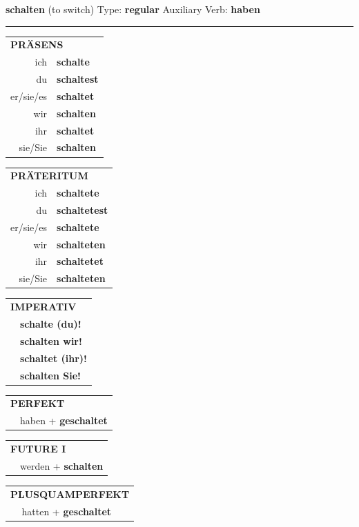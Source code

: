 \documentclass[10pt,a4paper]{revtex4-2}
\begin{document}
\begin{verbbox}
{\Large \bf schalten} (to switch) \hfill Type: \textbf{regular} \hfill Auxiliary Verb: \textbf{haben} 

\vspace{5pt}
\hrule
\vspace{5pt}

\begin{tabular}{rl}
\multicolumn{2}{l}{\textbf{PRÄSENS}}\\
ich & \textbf{schalte}\\
du & \textbf{schaltest}\\
er/sie/es & \textbf{schaltet}\\
wir & \textbf{schalten}\\
ihr & \textbf{schaltet}\\
sie/Sie & \textbf{schalten}\\
\end{tabular}
\hfill
\begin{tabular}{rl}
\multicolumn{2}{l}{\textbf{PRÄTERITUM}}\\
ich & \textbf{schaltete}\\
du & \textbf{schaltetest}\\
er/sie/es & \textbf{schaltete}\\
wir & \textbf{schalteten}\\
ihr & \textbf{schaltetet}\\
sie/Sie & \textbf{schalteten}\\
\end{tabular}
\hfill
\begin{tabular}{rl}
\multicolumn{2}{l}{\textbf{IMPERATIV}}\\
& \textbf{schalte (du)!}\\
& \textbf{schalten wir!}\\
& \textbf{schaltet (ihr)!}\\
& \textbf{schalten Sie!}\\
\end{tabular}

\vspace{10pt}

\begin{tabular}{rl}
\multicolumn{2}{l}{\textbf{PERFEKT}}\\
& haben + \textbf{geschaltet}\\
\end{tabular}
\hfill
\begin{tabular}{rl}
\multicolumn{2}{l}{\textbf{FUTURE I}}\\
& werden + \textbf{schalten}\\
\end{tabular}
\hfill
\begin{tabular}{rl}
\multicolumn{2}{l}{\textbf{PLUSQUAMPERFEKT}}\\
& hatten + \textbf{geschaltet}\\
\end{tabular}


\end{verbbox}
\end{document}
